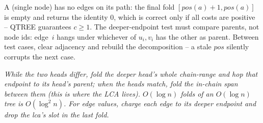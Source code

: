 \begin{hardeningbox}
A  (single node) has no edges on its path: the final fold \([\mathit{pos}(a)+1,\mathit{pos}(a)]\) is empty and  returns the identity \(0\), which is correct only if all costs are positive -- QTREE guarantees \(c\ge 1\).  The  deeper-endpoint test must compare parents, not node ids: edge~\(i\) hangs under whichever of \(u_i,v_i\) has the other as parent.  Between test cases, clear adjacency and rebuild the decomposition -- a stale \(\mathit{pos}\) silently corrupts the next case.
\end{hardeningbox}

\begin{recallbox}
\emph{While the two heads differ, fold the deeper head's whole chain-range and hop that endpoint to its head's parent; when the heads match, fold the in-chain span between them (this is where the LCA lives). \(O(\log n)\) folds of an \(O(\log n)\) tree is \(O(\log^2 n)\). For edge values, charge each edge to its deeper endpoint and drop the lca's slot in the last fold.}
\end{recallbox}

